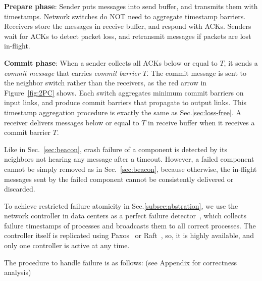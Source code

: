 \begin{ecompact}
\item \textbf{Prepare phase}: Sender puts messages into send buffer, and transmits them with timestamps. Network switches do NOT need to aggregate timestamp barriers. Receivers store the messages in receive buffer, and respond with ACKs. Senders wait for ACKs to detect packet loss, and retransmit messages if packets are lost in-flight.
\item \textbf{Commit phase}: When a sender collects all ACKs below or equal to $T$, it sends a \emph{commit message} that carries \emph{commit barrier} $T$. The commit message is sent to the neighbor switch rather than the receivers, as the red arrow in Figure~\ref{fig:2PC} shows. Each switch aggregates minimum commit barriers on input links, and produce commit barriers that propagate to output links. This timestamp aggregation procedure is exactly the same as Sec.\ref{sec:loss-free}. A receiver delivers messages below or equal to $T$ in receive buffer when it receives a commit barrier $T$.
\end{ecompact}



Like in Sec.~\ref{sec:beacon}, crash failure of a component is detected by its neighbors not hearing any message after a timeout.
However, a failed component cannot be simply removed as in Sec.~\ref{sec:beacon}, because otherwise, the in-flight messages sent by the failed component cannot be consistently delivered or discarded.

To achieve restricted failure atomicity in Sec.\ref{subsec:abstration}, we use the network controller in data centers as a perfect failure detector~\cite{chandra1996unreliable}, which collects failure timestamps of processes and broadcasts them to all correct processes.
The controller itself is replicated using Paxos~\cite{lamport1998part} or Raft~\cite{raft}, so, it is highly available, and only one controller is active at any time.

The procedure to handle failure is as follows: (see Appendix for correctness analysis)

